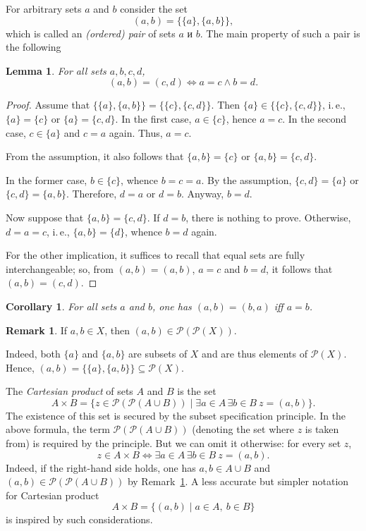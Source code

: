 \documentclass[12pt,notitlepage]{article}
\theoremstyle{plain}
\newtheorem{lemma}[thm]{Lemma}
\newtheorem{corr}[thm]{Corollary}
\theoremstyle{definition}
\newtheorem{rem}[thm]{Remark}
\theoremstyle{plain}
\newcommand{\sbs}{\subseteq}
\newcommand{\mP}{\mathcal{P}}
\newcommand{\1}{\mathbf{1}}
\newcommand{\0}{\mathbf{0}}
\begin{document}
For arbitrary sets $a$ and $b$ consider the set
$$(a,b) = \{\{a\}, \{a, b\}\},$$
which is called an \emph{(ordered) pair} of sets $a$ и $b$. The main property of such a pair is the following
\begin{lemma}\label{ch0:pair}
For all sets $a, b, c, d$, 
$$(a, b) = (c, d) \iff a = c \wedge b = d.$$
\end{lemma}
\begin{proof}
Assume that $\{\{a\}, \{a, b\}\} = \{\{c\}, \{c, d\}\}$. Then $\{a\} \in \{\{c\}, \{c, d\}\}$, i.\,e., $\{a\} = \{c\}$ or $\{a\} = \{c, d\}$. In the first case, $a \in \{c\}$, hence $a = c$. In the second case, $c \in \{a\}$ and $c = a$ again. Thus, $a = c$.

From the assumption, it also follows that $\{a, b\} = \{c\}$ or $\{a, b\} = \{c, d\}$. 

In the former case, $b \in \{c\}$, whence $b = c = a$. By the assumption, $\{c,d\} = \{a\}$ or $\{c,d\} = \{a,b\}$. Therefore, $d = a$ or $d = b$. Anyway, $b = d$.

Now suppose that $\{a, b\} = \{c, d\}$. If $d = b$, there is nothing to prove. Otherwise, $d = a = c$, i.\,e., $\{a, b\} = \{d\}$, whence $b = d$ again.

For the other implication, it suffices to recall that equal sets are fully interchangeable; so, from $(a, b) = (a, b)$, $a = c$ and $b = d$, it follows that $(a, b) = (c, d)$.
\end{proof}
\begin{corr}
For all sets $a$ and $b$, one has $(a, b) = (b, a)$ iff $a = b$.
\end{corr}

\begin{rem}\label{L4:pair_collect}
If $a, b \in X$, then $(a, b) \in \mP (\mP (X))$.

Indeed, both $\{a\}$ and $\{a,b\}$ are subsets of $X$ and are thus elements of $\mP(X)$. Hence, $(a,b) = \{ \{a\}, \{ a,b\} \} \sbs \mP(X)$.
\end{rem}
\noindent The \emph{Cartesian product} of sets $A$ and $B$ is the set
$$A \times B = \{z \in \mP (\mP (A \cup B)) \mid \exists a \in A\, \exists b \in B\ z = (a, b) \}.$$
The existence of this set is secured by the subset specification principle. In the above formula, the term $\mP (\mP (A \cup B))$ (denoting the set where $z$ is taken from) is required by the principle. But we can omit it otherwise: for every set $z$,
$$z \in A \times B \iff \exists a \in A\, \exists b \in B\ z = (a, b).$$
Indeed, if the right-hand side holds, one has $a, b \in A \cup B$ and $(a,b) \in \mP (\mP (A \cup B))$ by Remark~\ref{L4:pair_collect}. A less accurate but simpler notation for Cartesian product 
$$A \times B = \{(a, b) \mid a \in A,\ b \in B\}$$
is inspired by such considerations.
\end{document}

